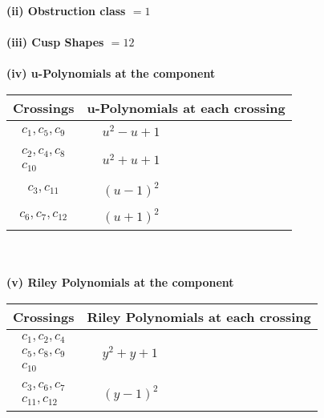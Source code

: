 \documentclass[1p]{elsarticle_modified}
\theoremstyle{definition}
\begin{document}
\flushleft \textbf{(ii) Obstruction class $= 1$}\\~\\
\flushleft \textbf{(iii) Cusp Shapes $= 12$}\\~\\
\newpage\renewcommand{\arraystretch}{1}
\flushleft \textbf{(iv) u-Polynomials at the component}\newline \\
\begin{tabular}{m{50pt}|m{274pt}}
Crossings & \hspace{64pt}u-Polynomials at each crossing \\
\hline $$\begin{aligned}c_{1},c_{5},c_{9}\end{aligned}$$&$\begin{aligned}
&u^2- u+1
\end{aligned}$\\
\hline $$\begin{aligned}c_{2},c_{4},c_{8}\\c_{10}\end{aligned}$$&$\begin{aligned}
&u^2+u+1
\end{aligned}$\\
\hline $$\begin{aligned}c_{3},c_{11}\end{aligned}$$&$\begin{aligned}
&(u-1)^2
\end{aligned}$\\
\hline $$\begin{aligned}c_{6},c_{7},c_{12}\end{aligned}$$&$\begin{aligned}
&(u+1)^2
\end{aligned}$\\
\hline
\end{tabular}\\~\\
\newpage\renewcommand{\arraystretch}{1}
\flushleft \textbf{(v) Riley Polynomials at the component}\newline \\
\begin{tabular}{m{50pt}|m{274pt}}
Crossings & \hspace{64pt}Riley Polynomials at each crossing \\
\hline $$\begin{aligned}c_{1},c_{2},c_{4}\\c_{5},c_{8},c_{9}\\c_{10}\end{aligned}$$&$\begin{aligned}
&y^2+y+1
\end{aligned}$\\
\hline $$\begin{aligned}c_{3},c_{6},c_{7}\\c_{11},c_{12}\end{aligned}$$&$\begin{aligned}
&(y-1)^2
\end{aligned}$\\
\hline
\end{tabular}\\~\\
\end{document}
